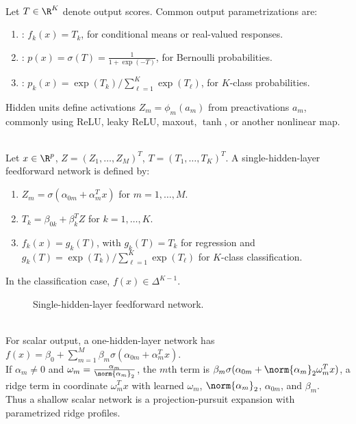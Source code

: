 \begin{definition} \label{def:sl-output-and-hidden-units} \\
Let $T\in\R^K$ denote output scores. Common output parametrizations are:
\begin{enumerate}[label=(\roman*)]
\setlength{\itemsep}{0pt}
\item {}: $f_k(x)=T_k$, for conditional means or real-valued responses.
\item {}: $p(x)=\sigma(T)=\frac{1}{1+\exp(-T)}$, for Bernoulli probabilities.
\item {}: $p_k(x)=\exp(T_k)/\sum\limits_{\ell=1}^K\exp(T_\ell)$, for $K$-class probabilities.
\end{enumerate}
Hidden units define activations $Z_m=\phi_m(a_m)$ from preactivations $a_m$, commonly using ReLU, leaky ReLU, maxout, $\tanh$, or another nonlinear map.
\end{definition}

\begin{definition} \label{def:sl-single-hidden-layer-network} \\
Let $x\in\R^p$, $Z=(Z_1,\ldots,Z_M)^T$, $T=(T_1,\ldots,T_K)^T$. A single-hidden-layer feedforward network is defined by:
\begin{enumerate}[label=(\roman*)]
\setlength{\itemsep}{0pt}
\item $Z_m=\sigma(\alpha_{0m}+\alpha_m^Tx)$ for $m=1,\ldots,M$.
\item $T_k=\beta_{0k}+\beta_k^TZ$ for $k=1,\ldots,K$.
\item $f_k(x)=g_k(T)$, with $g_k(T)=T_k$ for regression and $g_k(T)=\exp(T_k)/\sum\limits_{\ell=1}^K\exp(T_\ell)$ for $K$-class classification.
\end{enumerate}
In the classification case, $f(x)\in\Delta^{K-1}$.
\end{definition}

\begin{figure}[H]
\centering

\caption{Single-hidden-layer feedforward network.}
\label{fig:sl-single-hidden-layer-network}
\end{figure}

\begin{remark} \label{rem:sl-neural-networks-as-ridge-expansions} \\
For scalar output, a one-hidden-layer network has $f(x)=\beta_0+\sum\limits_{m=1}^M\beta_m\sigma(\alpha_{0m}+\alpha_m^Tx)$.\\
If $\alpha_m\ne0$ and $\omega_m=\frac{\alpha_m}{\norm{\alpha_m}_2}$, the $m$th term is $\beta_m\sigma(\alpha_{0m}+\norm{\alpha_m}_2\omega_m^Tx)$, a ridge term in coordinate $\omega_m^Tx$ with learned  $\omega_m$,  $\norm{\alpha_m}_2$,  $\alpha_{0m}$, and  $\beta_m$.\\
Thus a shallow scalar network is a projection-pursuit expansion with parametrized ridge profiles.
\end{remark}

